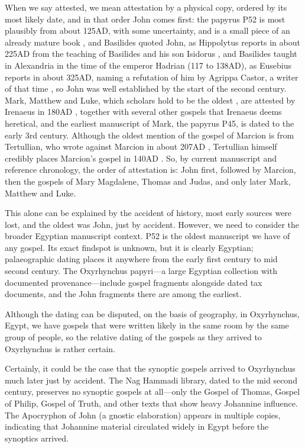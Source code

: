 When we say attested, we mean attestation by a physical copy, ordered by its most likely date, and in that order John comes first: the papyrus P52 is most plausibly from about 125AD, with some uncertainty, and is a small piece of an already mature book \cite{intf:liste}, and Basilides quoted John, as Hippolytus reports in about 225AD from the teaching of Basilides and his son Isidorus \cite[7.22]{hippolytus:refutatio}, and Basilides taught in Alexandria in the time of the emperor Hadrian (117 to 138AD), as Eusebius reports in about 325AD, naming a refutation of him by Agrippa Castor, a writer of that time \cite[4.7]{eusebius:he}, so John was well established by the start of the second century.
Mark, Matthew and Luke, which scholars hold to be the oldest \cite{hengel:fourgospels}, are attested by Irenaeus in 180AD \cite[3.1.1]{irenaeus:advhaer}, together with several other gospels that Irenaeus deems heretical, and the earliest manuscript of Mark, the papyrus P45, is dated to the early 3rd century.
Although the oldest mention of the gospel of Marcion is from Tertullian, who wrote against Marcion in about 207AD \cite[1.15]{tertullian:marcionem}, Tertullian himself credibly places Marcion's gospel in 140AD \cite[1.19]{tertullian:marcionem}.
So, by current manuscript and reference chronology, the order of attestation is: John first, followed by Marcion, then the gospels of Mary Magdalene, Thomas and Judas, and only later Mark, Matthew and Luke.

This alone can be explained by the accident of history, most early sources were lost, and the oldest was John, just by accident.
However, we need to consider the broader Egyptian manuscript context.
P52 is the oldest manuscript we have of any gospel.
Its exact findspot is unknown, but it is clearly Egyptian; palaeographic dating places it anywhere from the early first century to mid second century.
The Oxyrhynchus papyri---a large Egyptian collection with documented provenance---include gospel fragments alongside dated tax documents, and the John fragments there are among the earliest.

Although the dating can be disputed, on the basis of geography, in Oxyrhynchus, Egypt, we have gospels that were written likely in the same room by the same group of people, so the relative dating of the gospels as they arrived to Oxyrhynchus is rather certain.

Certainly, it could be the case that the synoptic gospels arrived to Oxyrhynchus much later just by accident.
The Nag Hammadi library, dated to the mid second century, preserves no synoptic gospels at all---only the Gospel of Thomas, Gospel of Philip, Gospel of Truth, and other texts that show heavy Johannine influence.
The Apocryphon of John (a gnostic elaboration) appears in multiple copies, indicating that Johannine material circulated widely in Egypt before the synoptics arrived.

